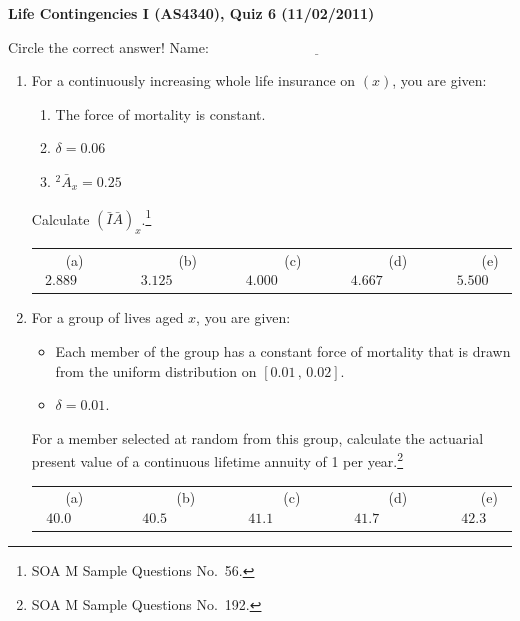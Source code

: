\documentclass[11pt,fleqn,oneside]{book}
\begin{document}
\thispagestyle{empty}
\setcounter{page}{1}
\begin{center}
{ \large \bf Life Contingencies I (AS4340), Quiz 6 (11/02/2011)}
\end{center}
\noindent
Circle the correct answer! Name: $\underline{\;\;\;\;\;\;\;\;\;\;\;\;\;\;\;\;\;\;\;\;\;\;\;\;\;\;\;\;\;\;\;\;\;\;\;\;\;\;\;\;\;\;\;\;\;\;\;\;\;\;\;\;\;}$
\begin{enumerate}
\item For a continuously increasing whole life insurance on $(x)$, you are given:
\begin{enumerate}
\item The force of mortality is constant.
\item $\delta = 0.06$
\item ${^2\bar{A}_x} = 0.25$
\end{enumerate}
Calculate $\left(\bar{I}\bar{A}\right)_x$.\footnote[1]{SOA M Sample Questions No.\ 56.}

\vspace{0.1cm}
\begin{center}
\small
\begin{tabular}{c c c c c}
(a) $2.889\;\;\;\;\;\;\;$ & 
$\;\;\;\;\;\;\;\;\;$(b) $3.125\;\;\;\;\;\;\;$ &
$\;\;\;\;\;\;\;\;\;$(c) $4.000\;\;\;\;\;\;\;$ & 
$\;\;\;\;\;\;\;\;\;$(d) $4.667\;\;\;\;\;\;\;$ &
$\;\;\;\;\;\;\;\;\;$(e) $5.500$
\end{tabular}
\end{center}
\vspace{0.1cm}

\normalsize



\item For a group of lives aged $x$, you are given:
\begin{itemize}
\item Each member of the group has a constant force of mortality that is drawn from the uniform distribution on $[0.01\,,\,0.02]$.
\item $\delta = 0.01$.
\end{itemize}
For a member selected at random from this group, calculate the actuarial present value of a continuous lifetime annuity of 1 per year.\footnote[2]{SOA M Sample Questions No.\ 192.}

\vspace{0.1cm}
\begin{center}
\small
\begin{tabular}{c c c c c}
(a) $40.0\;\;\;\;\;\;\;\;$ & 
$\;\;\;\;\;\;\;\;$(b) $40.5\;\;\;\;\;\;\;\;$ &
$\;\;\;\;\;\;\;\;$(c) $41.1\;\;\;\;\;\;\;\;$ & 
$\;\;\;\;\;\;\;\;$(d) $41.7\;\;\;\;\;\;\;\;$ &
$\;\;\;\;\;\;\;\;$(e) $42.3$
\end{tabular}
\normalsize
\end{center}
\vspace{0.1cm}


\end{enumerate}
\end{document}
